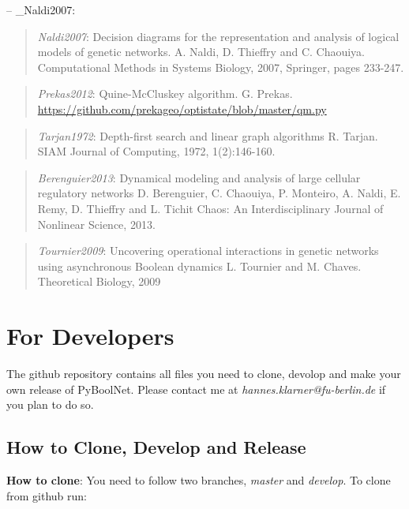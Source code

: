 \documentclass[letterpaper,10pt,english]{sphinxmanual}
\begin{document}
-- \_Naldi2007:
\begin{quote}

\emph{Naldi2007}:
Decision diagrams for the representation and analysis of logical models of genetic networks.
A. Naldi, D. Thieffry and C. Chaouiya.
Computational Methods in Systems Biology, 2007, Springer, pages 233-247.
\end{quote}
\label{Bibliography:prekas2012}\begin{quote}

\emph{Prekas2012}:
Quine-McCluskey algorithm.
G. Prekas.
\href{https://github.com/prekageo/optistate/blob/master/qm.py}{https://github.com/prekageo/optistate/blob/master/qm.py}
\end{quote}
\label{Bibliography:tarjan1972}\begin{quote}

\emph{Tarjan1972}:
Depth-first search and linear graph algorithms
R. Tarjan.
SIAM Journal of Computing, 1972, 1(2):146-160.
\end{quote}
\label{Bibliography:berenguier2013}\begin{quote}

\emph{Berenguier2013}:
Dynamical modeling and analysis of large cellular regulatory networks
D. Berenguier, C. Chaouiya, P. Monteiro, A. Naldi, E. Remy, D. Thieffry and L. Tichit
Chaos: An Interdisciplinary Journal of Nonlinear Science, 2013.
\end{quote}
\label{Bibliography:tournier2009}\begin{quote}

\emph{Tournier2009}:
Uncovering operational interactions in genetic networks using asynchronous Boolean dynamics
L. Tournier and M. Chaves.
Theoretical Biology, 2009
\end{quote}


\chapter{For Developers}
\label{Development:networkx-has-path}\label{Development::doc}\label{Development:for-developers}
The github repository contains all files you need to clone, devolop and make your own release of PyBoolNet.
Please contact me at \emph{hannes.klarner@fu-berlin.de} if you plan to do so.


\section{How to Clone, Develop and Release}
\label{Development:how-to-clone-develop-and-release}
\textbf{How to clone}:
You need to follow two branches, \emph{master} and \emph{develop}.
To clone from github run:
\end{document}

